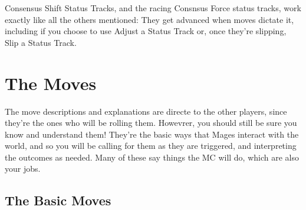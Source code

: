 \documentclass[
  oneside,
  statementpaper,
  9pt]{memoir}
\begin{document}
\begin{MC}

Consensus Shift Status Tracks, and the racing Consnsus Force status tracks, work exactly like all the others mentioned: They get advanced when moves dictate it, including if you choose to use Adjust a Status Track or, once they're slipping, Slip a Status Track.

\end{MC}

\newpage

\hypertarget{the-moves}{%
\chapter{The Moves}\label{the-moves}}

\begin{MC}

The move descriptions and explanations are directe to the other players, since they're the ones who will be rolling them. Howevrer, you should still be sure you know and understand them! They're the basic ways that Mages interact with the world, and so you will be calling for them as they are triggered, and interpreting the outcomes as needed. Many of these say things the MC will do, which are also your jobs.

\end{MC}

\hypertarget{the-basic-moves}{%
\section{The Basic Moves}\label{the-basic-moves}}
\end{document}
